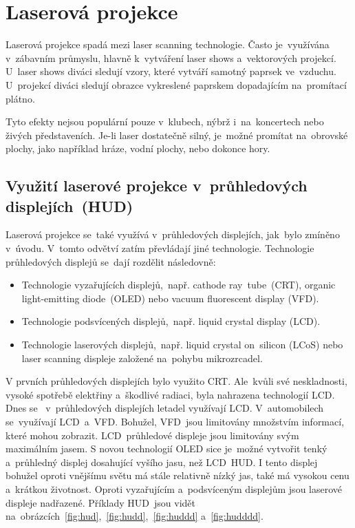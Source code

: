\chapter{Laserová projekce~\cite{laser-projection}}
Laserová projekce spadá mezi laser scanning technologie. Často je~využívána  v~zábavním průmyslu, hlavně  k~vytváření laser shows a~vektorových projekcí.  U~laser shows diváci sledují vzory, které vytváří samotný paprsek ve~vzduchu.  U~projekcí diváci sledují obrazce vykreslené paprskem dopadajícím na~promítací plátno.

Tyto efekty nejsou populární pouze  v~klubech, nýbrž  i~na~koncertech nebo živých představeních. Je-li laser dostatečně silný, je~možné promítat na~obrovské plochy, jako například hráze, vodní plochy, nebo dokonce hory. 

\section{Využití laserové projekce v~průhledových displejích~(HUD)~\cite{laser-huds}\cite{dev-of-laser-huds-in-driving}}
Laserová projekce se~také využívá  v~průhledových displejích,  jak~bylo zmíněno  v~úvodu.  V~tomto odvětví zatím převládají jiné technologie. Technologie průhledových displejů se~dají rozdělit následovně:

\begin{itemize}
  \item Technologie vyzařujících displejů,~např. cathode  ray~tube~(CRT), organic light-emitting diode~(OLED) nebo vacuum fluorescent display (VFD).
  \item Technologie podsvícených displejů,~např. liquid crystal display (LCD).
  \item Technologie laserových displejů,~např. liquid crystal on~silicon (LCoS) nebo laser scanning displeje založené na~pohybu mikrozrcadel.
\end{itemize}

V prvních průhledových displejích bylo využito CRT.  Ale~kvůli své neskladnosti, vysoké spotřebě elektřiny a~škodlivé radiaci, byla nahrazena technologií LCD. Dnes se ~v~průhledových displejích letadel využívají LCD.  V~automobilech se~využívají  LCD~a~VFD.
Bohužel,  VFD~jsou limitovány množstvím informací, které mohou zobrazit.  LCD~průhledové displeje jsou limitovány svým maximálním jasem.
S novou technologií OLED sice je~možné vytvořit tenký a~průhledný displej dosahující vyšího jasu, než  LCD~HUD.
I tento displej bohužel oproti vnějšímu světu má stále relativně nízký jas, také má vysokou cenu a~krátkou životnost.
Oproti vyzařujícím a~podsvíceným displejům jsou laserové displeje nadřazené.
Příklady  HUD~jsou vidět  na~obrázcích~\ref{fig:hud},~\ref{fig:hudd},~\ref{fig:huddd} a~\ref{fig:hudddd}.

